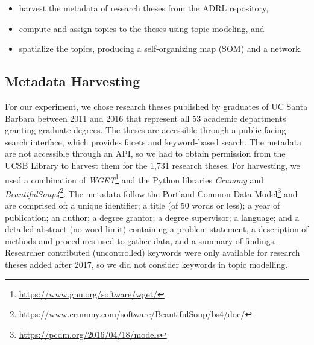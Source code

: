 \documentclass[a4paper,UKenglish]{lipics-v2018}
\begin{document}
\begin{itemize}
\item harvest the metadata of research theses from the ADRL repository, 
\item compute and assign topics to the theses using topic modeling, and 
\item spatialize the topics, producing a self-organizing map (SOM) and a network.
\end{itemize}

\subsection{Metadata Harvesting}
For our experiment, we chose research theses published by graduates of UC Santa Barbara between 2011 and 2016 that represent all 53 academic departments granting graduate degrees. The theses are accessible through a public-facing search interface, which provides facets and keyword-based search. The metadata are not accessible through an API, so we had to obtain permission from the UCSB Library to harvest them for the 1,731 research theses. For harvesting, we used a combination of \textit{WGET}\footnote{\url{https://www.gnu.org/software/wget/}} and the Python libraries \textit{Crummy} and \textit{BeautifulSoup4}\footnote{\url{https://www.crummy.com/software/BeautifulSoup/bs4/doc/}}. The metadata follow the Portland Common Data Model\footnote{\url{https://pcdm.org/2016/04/18/models}} and are comprised of: a unique identifier; a title (of 50 words or less); a year of publication; an author; a degree grantor; a degree supervisor; a language; and a detailed abstract (no word limit) containing a problem statement, a description of methods and procedures used to gather data, and a summary of findings. Researcher contributed (uncontrolled) keywords were only available for research theses added after 2017, so we did not consider keywords in topic modelling. 
\end{document}
